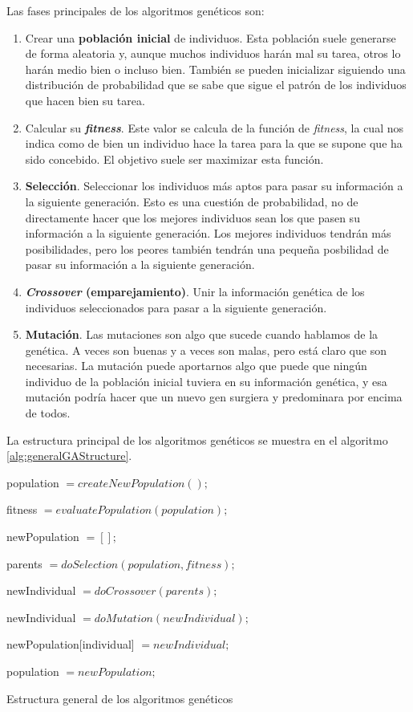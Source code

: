Las fases principales de los algoritmos genéticos son:
\begin{enumerate}
    \item Crear una \textbf{población inicial} de individuos. Esta población suele generarse de forma aleatoria y, aunque muchos individuos harán mal su tarea, otros lo harán medio bien o incluso bien. También se pueden inicializar siguiendo una distribución de probabilidad que se sabe que sigue el patrón de los individuos que hacen bien su tarea.
    \item Calcular su \textbf{\textit{fitness}}. Este valor se calcula de la función de \textit{fitness}, la cual nos indica como de bien un individuo hace la tarea para la que se supone que ha sido concebido. El objetivo suele ser maximizar esta función.
    \item \textbf{Selección}. Seleccionar los individuos más aptos para pasar su información a la siguiente generación. Esto es una cuestión de probabilidad, no de directamente hacer que los mejores individuos sean los que pasen su información a la siguiente generación. Los mejores individuos tendrán más posibilidades, pero los peores también tendrán una pequeña posbilidad de pasar su información a la siguiente generación.
    \item \textbf{\textit{Crossover} (emparejamiento)}. Unir la información genética de los individuos seleccionados para pasar a la siguiente generación.
    \item \textbf{Mutación}. Las mutaciones son algo que sucede cuando hablamos de la genética. A veces son buenas y a veces son malas, pero está claro que son necesarias. La mutación puede aportarnos algo que puede que ningún individuo de la población inicial tuviera en su información genética, y esa mutación podría hacer que un nuevo gen surgiera y predominara por encima de todos.
    \label{enum:geneticAlgorithmSteps}
\end{enumerate}

La estructura principal de los algoritmos genéticos se muestra en el algoritmo \ref{alg:generalGAStructure}.

\vspace{2mm}
\begin{algorithm}[H]
    population $= createNewPopulation();$
    
    {
        fitness $= evaluatePopulation(population);$
        
        newPopulation $= [];$
        
        {
            parents $= doSelection(population, fitness);$
            
            newIndividual $= doCrossover(parents);$
            
            newIndividual $= doMutation(newIndividual);$
            
            newPopulation[individual] $= newIndividual;$
        }
        
        population $= newPopulation;$
    }
	\caption{Estructura general de los algoritmos genéticos}
	\label{alg:generalGAStructure}
\end{algorithm}
\vspace{2mm}

